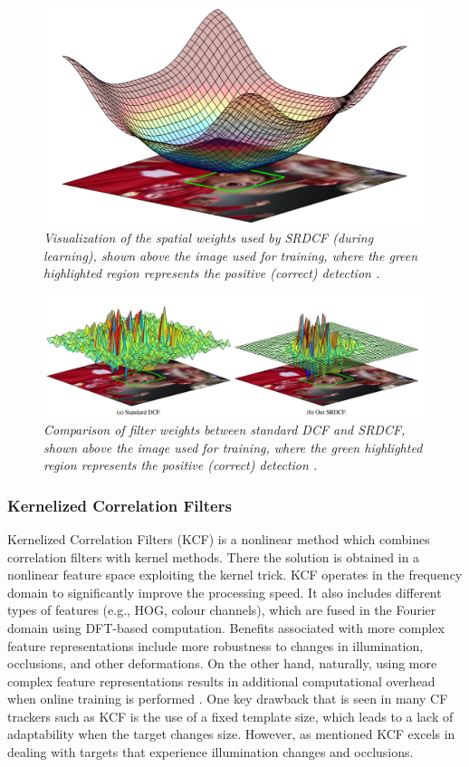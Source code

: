\documentclass[11pt, letterpaper]{article}
\begin{document}
\begin{figure}
  \centering
  \includegraphics[width=0.6\linewidth]{img/spatial-weights.png}
  \caption{\label{fig:spatial_weights}\textit{Visualization of the spatial weights used by SRDCF (during learning), shown above the image used for training, where the green highlighted region represents the positive (correct) detection \cite{danelljan_learning_2015}.}}
\end{figure}

\begin{figure}
  \centering
  \includegraphics[width=1\linewidth]{img/spatial-weights-compared.png}
  \caption{\label{fig:spatial_weights_compared}\textit{Comparison of filter weights between standard DCF and SRDCF, shown above the image used for training, where the green highlighted region represents the positive (correct) detection \cite{danelljan_learning_2015}.}}
\end{figure}

\subsubsection{Kernelized Correlation Filters}

Kernelized Correlation Filters (KCF) is a nonlinear method which combines correlation filters with kernel methods. There the solution is obtained in a nonlinear feature space exploiting the kernel trick. KCF operates in the frequency domain to significantly improve the processing speed. It also includes different types of features (e.g., HOG, colour channels), which are fused in the Fourier domain using DFT-based computation. Benefits associated with more complex feature representations include more robustness to changes in illumination, occlusions, and other deformations. On the other hand, naturally, using more complex feature representations results in additional computational overhead when online training is performed \cite{chumachenko_chapter_2022}. One key drawback that is seen in many CF trackers such as KCF is the use of a fixed template size, which leads to a lack of adaptability when the target changes size. However, as mentioned KCF excels in dealing with targets that experience illumination changes and occlusions.
\end{document}
